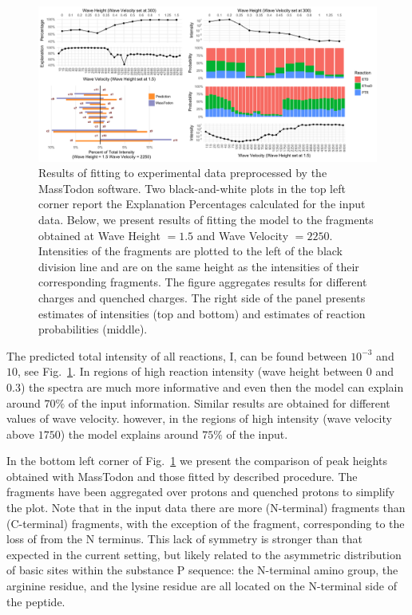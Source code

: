 \documentclass{llncs}
\begin{document}
\begin{figure}[h]
        \center
        \includegraphics[width=\textwidth]{melon.png}
        \caption{ Results of fitting to experimental data preprocessed by the {\sc MassTodon} software. Two black-and-white plots in the top left corner report the Explanation Percentages calculated for the input data. Below, we present results of fitting the model to the fragments obtained at Wave Height $= 1.5$ and Wave Velocity $= 2250$. Intensities of the  fragments are plotted to the left of the black division line and are on the same height as the intensities of their corresponding  fragments. The figure aggregates results for different charges and quenched charges. The right side of the panel presents estimates of intensities (top and bottom) and estimates of reaction probabilities (middle).
        }\label{fig::melon}
\end{figure}
The predicted total intensity of all reactions, I, can be found between $10^{-3}$ and $10$, see Fig.~\ref{fig::melon}. In regions of high reaction intensity (wave height between $0$ and $0.3$) the spectra are much more informative and even then the model can explain around $70\%$ of the input information. Similar results are obtained for different values of wave velocity. however, in the regions of high intensity (wave velocity above $1750$) the model explains around $75\%$ of the input.

In the bottom left corner of Fig.~\ref{fig::melon} we present the comparison of peak heights obtained with {\sc MassTodon} and those fitted by described procedure. The fragments have been aggregated over protons and quenched protons to simplify the plot. Note that in the input data there are more (N-terminal)  fragments than (C-terminal)  fragments, with the exception of the  fragment, corresponding to the loss of  from the N terminus. This lack of symmetry is stronger than that expected in the current setting, but likely related to the asymmetric distribution of basic sites within the substance P sequence: the N-terminal amino group, the arginine residue, and the lysine residue are all located on the N-terminal side of the peptide.
\end{document}
